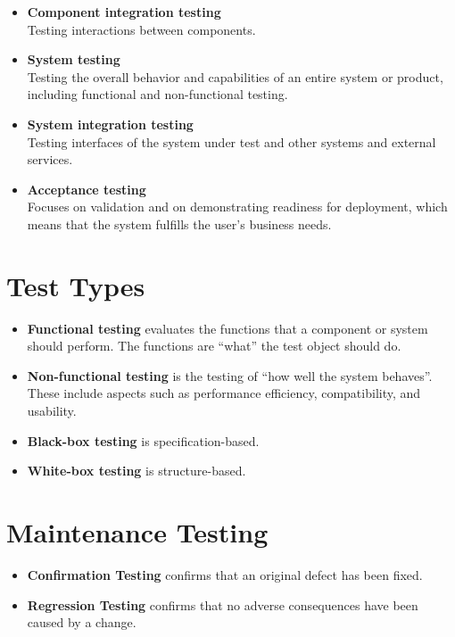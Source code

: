 \documentclass{article}
\begin{document}
\begin{multicols}{3}
{\begin{itemize}
  \item \textbf{Component integration testing}\\
  Testing interactions between components.
  
  \item \textbf{System testing}\\
  Testing the overall behavior and capabilities of an entire system or product, including functional and non-functional testing.
  
  \item \textbf{System integration testing}\\
  Testing interfaces of the system under test and other systems and external services.
  
  \item \textbf{Acceptance testing}\\
  Focuses on validation and on demonstrating readiness for deployment, which means that the system fulfills the user’s business needs.
\end{itemize}

\section*{Test Types}
\begin{itemize}
  \item \textbf{Functional testing} evaluates the functions that a component or system should perform. The functions are “what” the test object should do.
  \item \textbf{Non-functional testing} is the testing of “how well the system behaves”. These include aspects such as performance efficiency, compatibility, and usability.
  \item \textbf{Black-box testing} is specification-based.
  \item \textbf{White-box testing} is structure-based.
\end{itemize}

\section*{Maintenance Testing}
\begin{itemize}
  \item \textbf{Confirmation Testing} confirms that an original defect has been fixed.
  \item \textbf{Regression Testing} confirms that no adverse consequences have been caused by a change.
\end{itemize}
}


\end{multicols}
\end{document}
